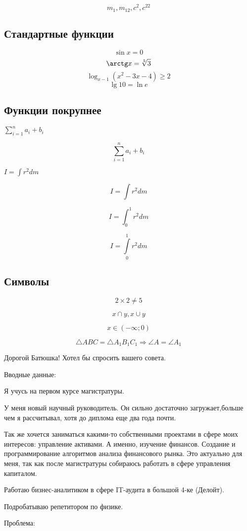 \documentclass[a4paper,12pt]{article} %
\begin{document}
\[ m_1, m_{12}, c^2, c^{22} \]

\subsection{Стандартные функции}

\[ \sin x=0 \]
\[ \arctg x=\sqrt[5]{3} \]
\[ \log_{x-1}{(x^2-3x-4)}\geqslant 2 \]
\[ \lg 10=\ln e \]

\subsection{Функции покрупнее}

$\sum_{i=1}^{n}a_i+b_i$

\[ \sum_{i=1}^{n}a_i+b_i \]

$I=\int r^2dm$

\[I=\int r^2dm \]

\[I=\int_{0}^{1} r^2dm \]

\[I=\int\limits_{0}^{1} r^2dm \]

\subsection{Символы}

\[2\times 2\neq 5 \]

\[x \cap y,  x \cup y\]

\[x\in (-\infty; 0)\]

\[ \triangle ABC = \triangle A_1B_1C_1 \Rightarrow \angle A= \angle A_1\]

\smiley

Дорогой Батюшка! Хотел бы спросить вашего совета.

Вводные данные:

Я учусь на первом курсе магистратуры. 

У меня новый научный руководитель. Он сильно достаточно загружает,больше чем я рассчитывал, хотя до диплома еще два года почти.

Так же хочется заниматься какими-то собственными проектами в сфере моих интересов: управление активами. А именно, изучение финансов. Создание и программирование алгоритмов анализа финансового рынка. Это актуально для меня, так как после магистратуры собираюсь работать в сфере управления капиталом.

Работаю бизнес-аналитиком в сфере IT-аудита в большой 4-ке (Делойт).

Подробатываю репетитором по физике.

Проблема:
\end{document}

